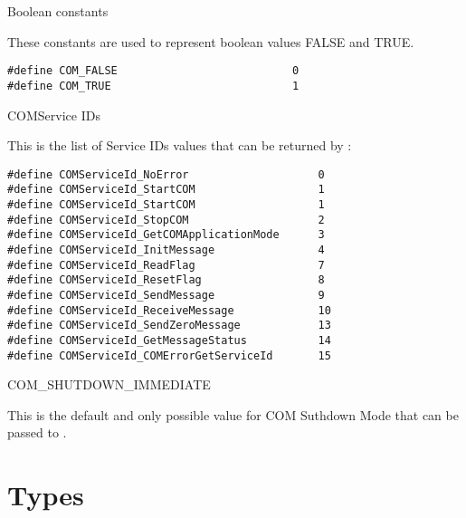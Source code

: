 \begin{constant}{Boolean constants}
  \begin{constantdescription}
    These constants are used to represent boolean values FALSE and TRUE.
    \begin {lstlisting}
#define COM_FALSE                           0
#define COM_TRUE                            1
    \end{lstlisting}
  \end{constantdescription}
\end{constant}

\begin{constant}{COMService IDs}
  \begin{constantdescription}
    This is the list of Service IDs values that can be returned by
    :
    \begin {lstlisting}
#define COMServiceId_NoError                    0
#define COMServiceId_StartCOM                   1
#define COMServiceId_StartCOM                   1
#define COMServiceId_StopCOM                    2
#define COMServiceId_GetCOMApplicationMode      3
#define COMServiceId_InitMessage                4
#define COMServiceId_ReadFlag                   7
#define COMServiceId_ResetFlag                  8
#define COMServiceId_SendMessage                9
#define COMServiceId_ReceiveMessage             10
#define COMServiceId_SendZeroMessage            13
#define COMServiceId_GetMessageStatus           14
#define COMServiceId_COMErrorGetServiceId       15

    \end{lstlisting}
  \end{constantdescription}
\end{constant}

\begin{constant}{COM\_SHUTDOWN\_IMMEDIATE}
  \begin{constantdescription}
    This is the default and only possible value for COM Suthdown Mode that can 
    be passed to .
  \end{constantdescription}
\end{constant}

\pagebreak




\section{Types}
\label{sec:types}

